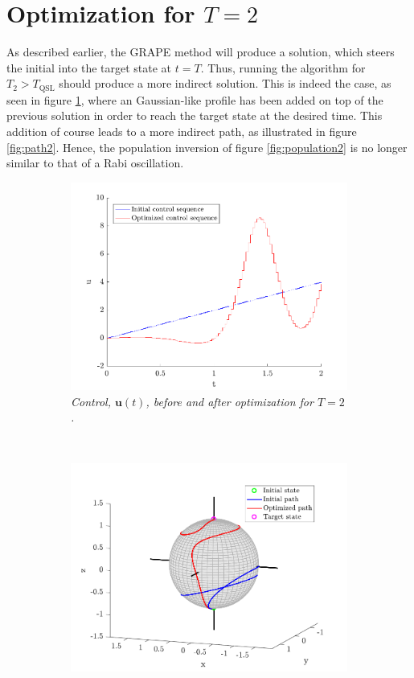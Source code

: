 \section{Optimization for $T = 2$ } 
As described earlier, the GRAPE method will produce a solution, which steers the initial into the target state at $t = T$. Thus, running the algorithm for $T_2 > T_{\mathrm{QSL}}$ should produce a more indirect solution.
This is indeed the case, as seen in figure \ref{fig:control2}, where an Gaussian-like profile has been added on top of the previous solution in order to reach the target state at the desired time. This addition of course leads to a more indirect path, as illustrated in figure \ref{fig:path2}. Hence, the population inversion of figure \ref{fig:population2} is no longer similar to that of a Rabi oscillation.
\begin{figure}[h!]
    \centering
    \begin{subfigure}[t]{0.49\textwidth}
        \includegraphics[width=\textwidth]{Figures/control2.pdf}
        \caption{\textit{Control, $\boldsymbol{u}(t)$, before and after optimization for $T = 2$.}}
        \label{fig:control2}
    \end{subfigure}
    ~
    \begin{subfigure}[t]{0.49\textwidth}
        \includegraphics[width=\textwidth]{Figures/path2.pdf}

\end{subfigure}
\end{figure}
